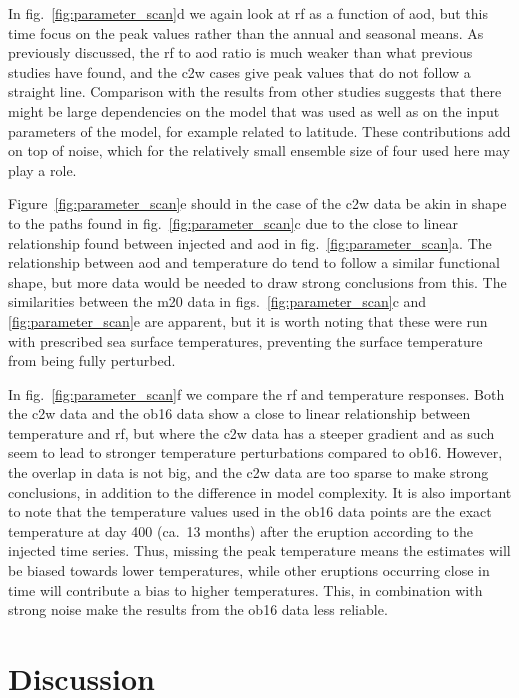 \documentclass{ametsocV6.1}
\newcommand{\iso}[1][i]{{#1}njected \ce{SO2}}
\begin{document}
In fig.~\ref{fig:parameter_scan}d we again look at \gls{rf} as a function of \gls{aod},
but this time focus on the peak values rather than the annual and seasonal means. As
previously discussed, the \gls{rf} to \gls{aod} ratio is much weaker than what previous
studies have found, and the \gls{c2w} cases give peak values that do not follow a
straight line. Comparison with the results from other studies \citep{jones2005,
  marshall2020, timmreck2010} suggests that there might be large dependencies on the model
that was used as well as on the input parameters of the model, for example related to
latitude. These contributions add on top of noise, which for the relatively small
ensemble size of four used here may play a role.

Figure~\ref{fig:parameter_scan}e should in the case of the \gls{c2w} data be akin in
shape to the paths found in fig.~\ref{fig:parameter_scan}c due to the close to linear
relationship found between \iso{} and \gls{aod} in fig.~\ref{fig:parameter_scan}a. The
relationship between \gls{aod} and temperature do tend to follow a similar functional
shape, but more data would be needed to draw strong conclusions from this. The
similarities between the \gls{m20} data in figs.~\ref{fig:parameter_scan}c and
\ref{fig:parameter_scan}e are apparent, but it is worth noting that these were run with
prescribed sea surface temperatures, preventing the surface temperature from being fully
perturbed.

In fig.~\ref{fig:parameter_scan}f we compare the \gls{rf} and temperature responses.
Both the \gls{c2w} data and the \gls{ob16} data show a close to linear relationship
between temperature and \gls{rf}, but where the \gls{c2w} data has a steeper gradient
and as such seem to lead to stronger temperature perturbations compared to \gls{ob16}.
However, the overlap in data is not big, and the \gls{c2w} data are too sparse to make
strong conclusions, in addition to the difference in model complexity. It is also
important to note that the temperature values used in the \gls{ob16} data points are the
exact temperature at day 400 (ca.\ 13 months) after the eruption according to the \iso{}
time series. Thus, missing the peak temperature means the estimates will be biased
towards lower temperatures, while other eruptions occurring close in time will
contribute a bias to higher temperatures. This, in combination with strong noise make
the results from the \gls{ob16} data less reliable.

\section{Discussion}\label{sec:discussion}
\end{document}
